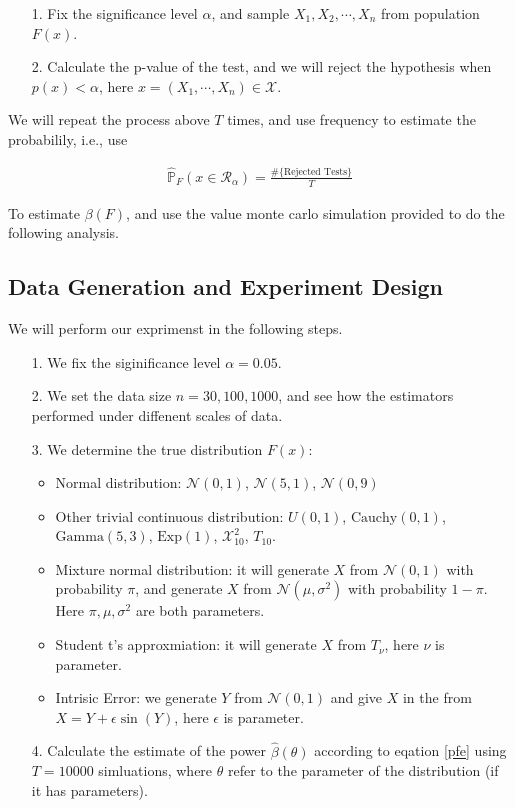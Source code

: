 \documentclass[twoside]{article}
\begin{document}
\begin{itemize}
  \item[1.] Fix the significance level $\alpha$, and sample $X_1, X_2, \cdots, X_n$ from population $F(x)$.
  \item[2.] Calculate the p-value of the test, and we will reject the hypothesis when $p(x) < \alpha$, here $x = (X_1, \cdots, X_n) \in \mathcal{
 X}$.
\end{itemize}

We will repeat the process above $T$ times, and use frequency to estimate the probabilily, i.e., use 

\begin{eqnarray}
\label{pfe}
  \hat{\mathbb{P}}_F(x \in \mathscr{R}_\alpha) = \frac{\#\{\text{Rejected Tests}\}}{T}
\end{eqnarray}

To estimate $\beta(F)$, and use the value monte carlo simulation provided to do the following analysis.

\subsection{Data Generation and Experiment Design}

We will perform our exprimenst in the following steps.

\begin{itemize}
  \item[1.] We fix the siginificance level $\alpha=0.05$.
  \item[2.] We set the data size $n=30, 100, 1000$, and see how the estimators performed under diffenent scales of data.
  \item[3.] We determine the true distribution $F(x)$:
  \begin{itemize}
    \item Normal distribution: $\mathcal{N}(0, 1)$, $\mathcal{N}(5, 1)$, $\mathcal{N}(0, 9)$
    \item Other trivial continuous distribution: $U(0, 1)$, $\mathrm{Cauchy}(0, 1)$, $\mathrm{Gamma}(5, 3)$, $\mathrm{Exp(1)}$, $\mathcal{X}_10^2$, $T_10$.
    \item Mixture normal distribution: it will generate $X$ from $\mathcal{N}(0, 1)$ with probability $\pi$, and generate $X$ from $\mathcal{N}(\mu, \sigma^2)$ with probability $1-\pi$. Here $\pi, \mu, \sigma^2$ are both parameters.
    \item Student t's approxmiation: it will generate $X$ from $T_\nu$, here $\nu$ is parameter.
    \item Intrisic Error: we generate $Y$ from $\mathcal{N}(0, 1)$ and give $X$ in the from $X = Y + \epsilon\sin(Y)$, here $\epsilon$ is parameter.
  \end{itemize}
  \item[4.] Calculate the estimate of the power $\hat{\beta}(\theta)$ according to eqation \ref{pfe} using $T=10000$ simluations, where $\theta$ refer to the parameter of the distribution (if it has parameters).
\end{itemize}
\end{document}
